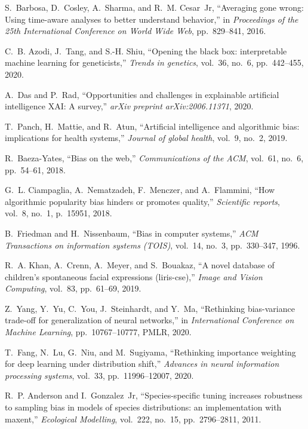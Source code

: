 \documentclass{article}
\begin{document}
\begin{thebibliography}{100}
	S.~Barbosa, D.~Cosley, A.~Sharma, and R.~M. Cesar~Jr, ``Averaging gone wrong:
	Using time-aware analyses to better understand behavior,'' in {\em
		Proceedings of the 25th International Conference on World Wide Web},
	pp.~829--841, 2016.
	
	C.~B. Azodi, J.~Tang, and S.-H. Shiu, ``Opening the black box: interpretable
	machine learning for geneticists,'' {\em Trends in genetics}, vol.~36, no.~6,
	pp.~442--455, 2020.
	
	A.~Das and P.~Rad, ``Opportunities and challenges in explainable artificial
	intelligence {XAI}: A survey,'' {\em arXiv preprint arXiv:2006.11371}, 2020.
	
	T.~Panch, H.~Mattie, and R.~Atun, ``Artificial intelligence and algorithmic
	bias: implications for health systems,'' {\em Journal of global health},
	vol.~9, no.~2, 2019.
	
	R.~Baeza-Yates, ``Bias on the web,'' {\em Communications of the ACM}, vol.~61,
	no.~6, pp.~54--61, 2018.
	
	G.~L. Ciampaglia, A.~Nematzadeh, F.~Menczer, and A.~Flammini, ``How algorithmic
	popularity bias hinders or promotes quality,'' {\em Scientific reports},
	vol.~8, no.~1, p.~15951, 2018.
	
	B.~Friedman and H.~Nissenbaum, ``Bias in computer systems,'' {\em ACM
		Transactions on information systems (TOIS)}, vol.~14, no.~3, pp.~330--347,
	1996.
	
	R.~A. Khan, A.~Crenn, A.~Meyer, and S.~Bouakaz, ``A novel database of
	children's spontaneous facial expressions (liris-cse),'' {\em Image and
		Vision Computing}, vol.~83, pp.~61--69, 2019.
	
	Z.~Yang, Y.~Yu, C.~You, J.~Steinhardt, and Y.~Ma, ``Rethinking bias-variance
	trade-off for generalization of neural networks,'' in {\em International
		Conference on Machine Learning}, pp.~10767--10777, PMLR, 2020.
	
	T.~Fang, N.~Lu, G.~Niu, and M.~Sugiyama, ``Rethinking importance weighting for
	deep learning under distribution shift,'' {\em Advances in neural information
		processing systems}, vol.~33, pp.~11996--12007, 2020.
	
	R.~P. Anderson and I.~Gonzalez~Jr, ``Species-specific tuning increases
	robustness to sampling bias in models of species distributions: an
	implementation with maxent,'' {\em Ecological Modelling}, vol.~222, no.~15,
	pp.~2796--2811, 2011.
	

\end{thebibliography}
\end{document}
